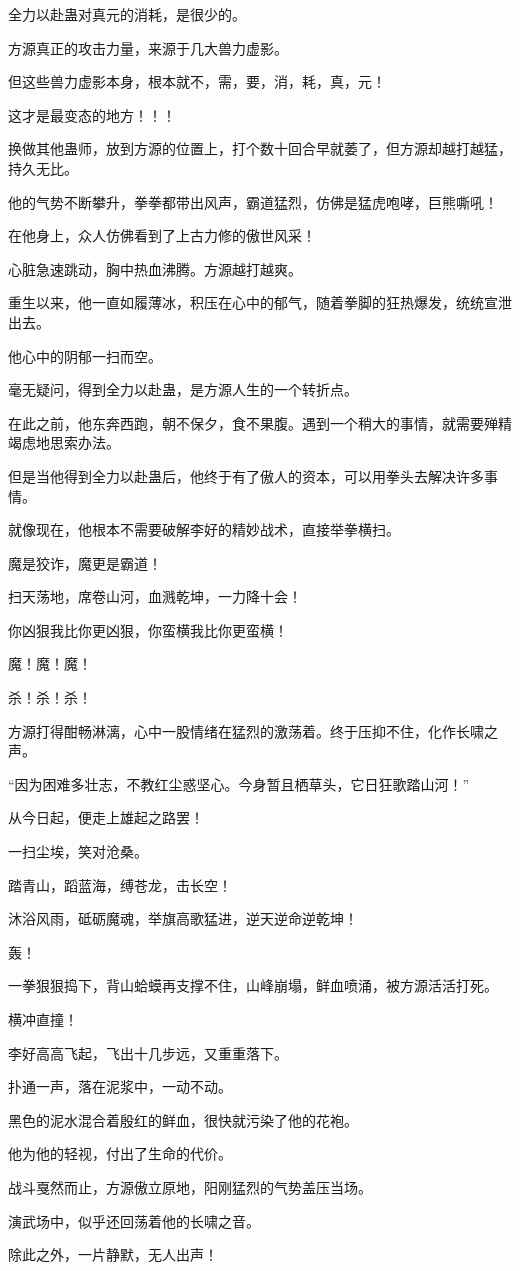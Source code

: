 \begin{this_body}
全力以赴蛊对真元的消耗，是很少的。

方源真正的攻击力量，来源于几大兽力虚影。

但这些兽力虚影本身，根本就不，需，要，消，耗，真，元！

这才是最变态的地方！！！

换做其他蛊师，放到方源的位置上，打个数十回合早就萎了，但方源却越打越猛，持久无比。

他的气势不断攀升，拳拳都带出风声，霸道猛烈，仿佛是猛虎咆哮，巨熊嘶吼！

在他身上，众人仿佛看到了上古力修的傲世风采！

心脏急速跳动，胸中热血沸腾。方源越打越爽。

重生以来，他一直如履薄冰，积压在心中的郁气，随着拳脚的狂热爆发，统统宣泄出去。

他心中的阴郁一扫而空。

毫无疑问，得到全力以赴蛊，是方源人生的一个转折点。

在此之前，他东奔西跑，朝不保夕，食不果腹。遇到一个稍大的事情，就需要殚精竭虑地思索办法。

但是当他得到全力以赴蛊后，他终于有了傲人的资本，可以用拳头去解决许多事情。

就像现在，他根本不需要破解李好的精妙战术，直接举拳横扫。

魔是狡诈，魔更是霸道！

扫天荡地，席卷山河，血溅乾坤，一力降十会！

你凶狠我比你更凶狠，你蛮横我比你更蛮横！

魔！魔！魔！

杀！杀！杀！

方源打得酣畅淋漓，心中一股情绪在猛烈的激荡着。终于压抑不住，化作长啸之声。

“因为困难多壮志，不教红尘惑坚心。今身暂且栖草头，它日狂歌踏山河！”

从今日起，便走上雄起之路罢！

一扫尘埃，笑对沧桑。

踏青山，蹈蓝海，缚苍龙，击长空！

沐浴风雨，砥砺魔魂，举旗高歌猛进，逆天逆命逆乾坤！

轰！

一拳狠狠捣下，背山蛤蟆再支撑不住，山峰崩塌，鲜血喷涌，被方源活活打死。

横冲直撞！

李好高高飞起，飞出十几步远，又重重落下。

扑通一声，落在泥浆中，一动不动。

黑色的泥水混合着殷红的鲜血，很快就污染了他的花袍。

他为他的轻视，付出了生命的代价。

战斗戛然而止，方源傲立原地，阳刚猛烈的气势盖压当场。

演武场中，似乎还回荡着他的长啸之音。

除此之外，一片静默，无人出声！

\end{this_body}

